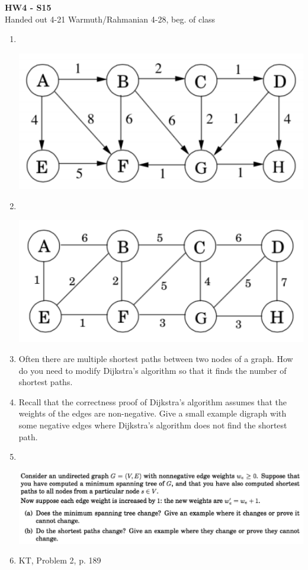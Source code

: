 \documentclass[11pt]{article}
\begin{document}
\begin{center}
{\bf\large HW4 - S15}\\
Handed out 4-21 \hfill Warmuth/Rahmanian \hfill 4-28, beg. of class \\
\end{center}

\begin{enumerate}
\item$\;$

\includegraphics[width=7in]{DPV41.PNG}
\item$\;$

\includegraphics[width=7in]{DPV51.PNG}
\item
Often there are multiple shortest paths between two nodes
of a graph. How do you need to modify Dijkstra's algorithm
so that it finds the number of shortest paths.
\item
Recall that the correctness proof of Dijkstra's algorithm
assumes that the weights of the edges are non-negative.
Give a small example digraph with some negative edges
where Dijkstra's algorithm does not find the shortest path.
\newpage
\item$\;$

\includegraphics[width=7in]{DPV55.PNG}
\item
KT, Problem 2, p. 189
\end{enumerate}
\end{document}
